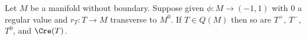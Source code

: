 \begin{corollary}\label{C: creasing Q}
	Let $M$ be a manifold without boundary.
	Suppose given $\phi \colon M \to (-1,1)$ with $0$ a regular value and $r_T \colon T \to M$ transverse to $M^0$.
	If $T \in Q(M)$ then so are $T^+$, $T^-$, $T^0$, and $\Cre(T)$.
\end{corollary}

